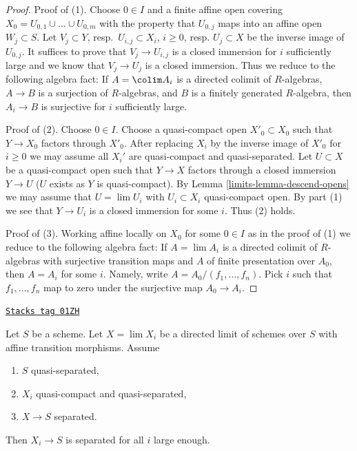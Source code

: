 \begin{proof}

Proof of (1). Choose $0 \in I$ and a finite affine open covering
$X_0 = U_{0, 1} \cup \ldots \cup U_{0, m}$ with the property that
$U_{0, j}$ maps into an affine open $W_j \subset S$.
Let $V_j \subset Y$, resp.\ $U_{i, j} \subset X_i$, $i \geq 0$,
resp. $U_j \subset X$ be the inverse image of $U_{0, j}$. It suffices
to prove that $V_j \to U_{i, j}$ is a closed immersion for $i$
sufficiently large and we know that $V_j \to U_j$ is a closed immersion.
Thus we reduce to the following algebra fact: If $A = \colim A_i$ is a
directed colimit of $R$-algebras, $A \to B$ is a surjection of $R$-algebras,
and $B$ is a finitely generated $R$-algebra, then
$A_i \to B$ is surjective for $i$ sufficiently large.

\medskip\noindent
Proof of (2). Choose $0 \in I$. Choose a quasi-compact open
$X'_0 \subset X_0$ such that $Y \to X_0$ factors through $X'_0$.
After replacing $X_i$ by the inverse image of $X'_0$ for $i \geq 0$
we may assume all $X_i'$ are quasi-compact and quasi-separated.
Let $U \subset X$ be a quasi-compact open such that $Y \to X$ factors
through a closed immersion $Y \to U$ ($U$ exists as $Y$ is quasi-compact). By
Lemma \ref{limits-lemma-descend-opens}
we may assume that $U = \lim U_i$ with $U_i \subset X_i$ quasi-compact
open. By part (1) we see that $Y \to U_i$ is a closed immersion for some
$i$. Thus (2) holds.

\medskip\noindent
Proof of (3). Working affine locally on $X_0$ for some $0 \in I$ as in
the proof of (1) we reduce to the following algebra fact: If $A = \lim A_i$
is a directed colimit of $R$-algebras with surjective transition
maps and $A$ of finite presentation over $A_0$, then $A = A_i$ for
some $i$. Namely, write $A = A_0/(f_1, \ldots, f_n)$. Pick $i$ such
that $f_1, \ldots, f_n$ map to zero under the surjective map $A_0 \to A_i$.
\end{proof}

\begin{lemma}
\label{limits-lemma-eventually-separated}
\href{https://stacks.math.columbia.edu/tag/01ZH}{\texttt{Stacks tag 01ZH}}

Let $S$ be a scheme. Let $X = \lim X_i$ be a directed
limit of schemes over $S$ with affine transition morphisms.
Assume
\begin{enumerate}
\item $S$ quasi-separated,
\item $X_i$ quasi-compact and quasi-separated,
\item $X \to S$ separated.
\end{enumerate}
Then $X_i \to S$ is separated for all $i$ large enough.
\end{lemma}

